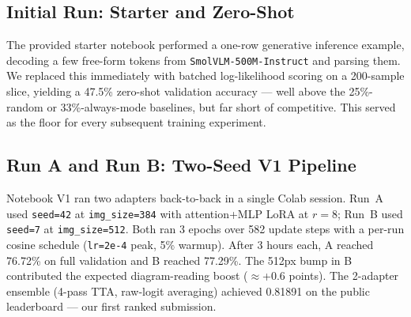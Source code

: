 \documentclass[11pt]{article}
\begin{document}
\begin{table}[H]
  \centering
  \caption{Submission history. Run E alone is our best legitimate score. Adding more adapters or modifying the inference pipeline both regressed accuracy.}
  \label{tab:lb}
\end{table}

\subsection{Initial Run: Starter and Zero-Shot}
The provided starter notebook performed a one-row generative inference example, decoding a few free-form tokens from \texttt{SmolVLM-500M-Instruct} and parsing them. We replaced this immediately with batched log-likelihood scoring on a 200-sample slice, yielding a 47.5\% zero-shot validation accuracy --- well above the 25\%-random or 33\%-always-mode baselines, but far short of competitive. This served as the floor for every subsequent training experiment.

\subsection{Run A and Run B: Two-Seed V1 Pipeline}
Notebook V1 ran two adapters back-to-back in a single Colab session. Run~A used \texttt{seed=42} at \texttt{img\_size=384} with attention+MLP LoRA at $r{=}8$; Run~B used \texttt{seed=7} at \texttt{img\_size=512}. Both ran 3 epochs over 582 update steps with a per-run cosine schedule (\texttt{lr=2e-4} peak, 5\% warmup). After 3 hours each, A reached 76.72\% on full validation and B reached 77.29\%. The 512px bump in B contributed the expected diagram-reading boost ($\approx$+0.6 points). The 2-adapter ensemble (4-pass TTA, raw-logit averaging) achieved 0.81891 on the public leaderboard --- our first ranked submission.
\end{document}
